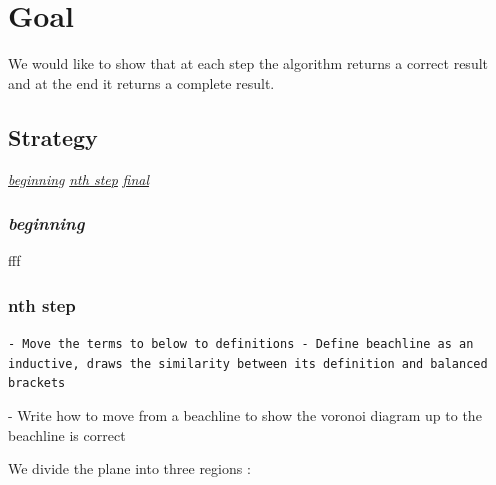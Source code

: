 \documentclass{article}
\begin{document}
\section{Goal}
We would like to show that at each step the algorithm returns a correct result and at the end it returns a complete result.
\subsection{Strategy}
\underline{{\color{gray} \textit{beginning}}} \underline{ {\color{blue} \textit{nth step}}} \underline{{\color{black} \textit{ final}}}

\subsubsection{{\color{gray} \textit{beginning}}}
fff
\subsubsection{{\color{blue} nth step}}
{\color{red} \tt - Move the terms to below to definitions \newline
\tt - Define beachline as an inductive, draws the similarity between its definition and balanced brackets \newline

- Write how to move from a beachline to show the voronoi diagram up to the beachline is correct  }


We divide the plane into three regions :
 
\end{document}
